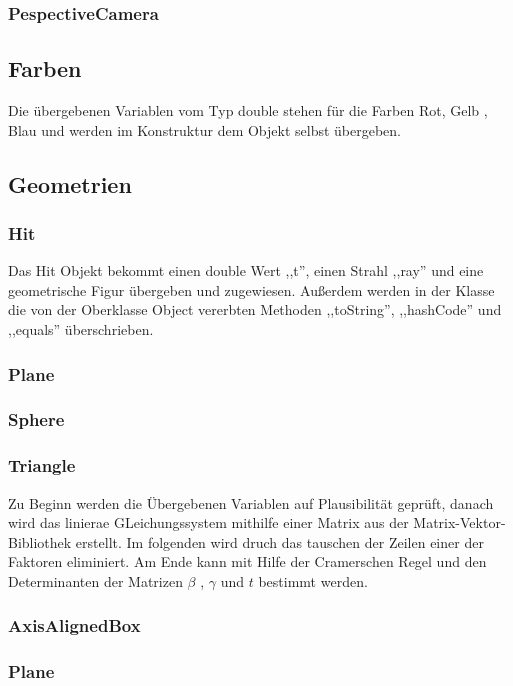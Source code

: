 \documentclass[14pt]{extarticle}
\begin{document}
\subsubsection{PespectiveCamera}
\subsection{Farben}
Die übergebenen Variablen vom Typ double stehen für die Farben Rot, Gelb , Blau und werden im Konstruktur dem Objekt selbst übergeben.
\subsection{Geometrien}

\subsubsection{Hit}
Das Hit Objekt bekommt einen double Wert ,,t'', einen Strahl ,,ray'' und eine geometrische Figur übergeben und zugewiesen. Außerdem werden in der Klasse die von der Oberklasse Object vererbten Methoden ,,toString'', ,,hashCode'' und ,,equals'' überschrieben.
\subsubsection{Plane}
\subsubsection{Sphere}
\subsubsection{Triangle}
Zu Beginn werden die Übergebenen Variablen auf Plausibilität geprüft, danach wird das linierae GLeichungssystem mithilfe einer Matrix aus der Matrix-Vektor-Bibliothek erstellt. Im folgenden wird druch das tauschen der Zeilen einer der Faktoren eliminiert. Am Ende kann mit Hilfe der Cramerschen Regel und den Determinanten der Matrizen $\beta$ , $\gamma$ und $t$ bestimmt werden.
\subsubsection{AxisAlignedBox}
\subsubsection{Plane}
\end{document}
